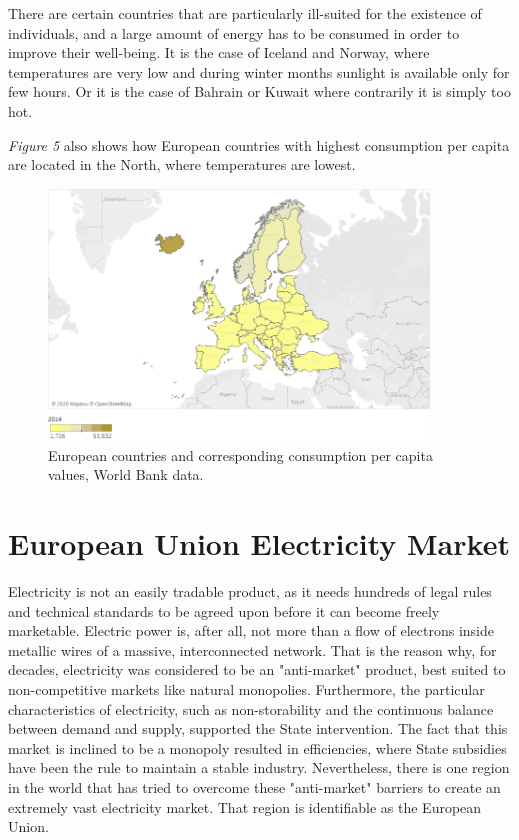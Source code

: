 \documentclass{book}
\begin{document}
There are certain countries that are particularly ill-suited for the existence of individuals, and a large amount of energy has to be consumed in order to improve their well-being. It is the case of Iceland and Norway, where temperatures are very low and during winter months sunlight is available only for few hours. Or it is the case of Bahrain or Kuwait where contrarily it is simply too hot.

\textit{Figure 5} also shows how European countries with highest consumption per capita are located in the North, where temperatures are lowest.

\bigskip
\begin{figure}[H]
\begin{center}
\captionsetup{justification=centering}
\includegraphics[width=0.9\textwidth]{Images/cons.png}
\caption{European countries and corresponding consumption per capita values, World Bank data. }
\end{center}
\end{figure}
\bigskip

\section*{European Union Electricity Market}

Electricity is not an easily tradable product, as it needs hundreds of  legal rules and technical standards to be agreed upon before it can become freely marketable. Electric power is, after all, not more than a flow of electrons inside metallic wires of a massive, interconnected network. That is the reason why, for decades, electricity was considered to be an "anti-market" product, best suited to non-competitive markets like natural monopolies. \cite{glachant2014eu} Furthermore, the particular characteristics of electricity, such as non-storability and the continuous balance between demand and supply, supported the State intervention. The fact that this market is inclined to be a monopoly resulted in efficiencies, where State subsidies have been the rule to maintain a stable industry. \cite{domanico2007concentration} Nevertheless, there is one region in the world that has tried to overcome these "anti-market" barriers to create an extremely vast electricity market. That region is identifiable as the European Union. \\
\end{document}
